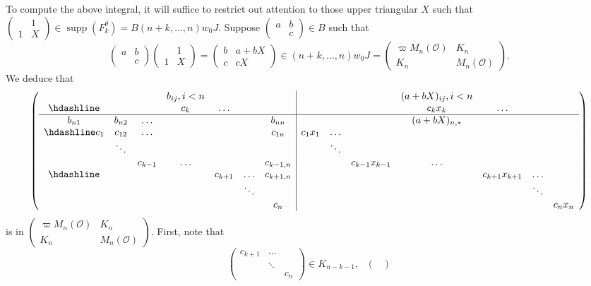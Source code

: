 \documentclass{amsart}
\theoremstyle{definition}
\newcommand{\supp}{\operatorname{supp}}
\begin{document}
{To compute the above integral, it will suffice to restrict out attention to those upper triangular $X$ such that 
$\begin{pmatrix}&1\\1&X\end{pmatrix}\in \supp(F_k^\theta)=B(n+k,\ldots,n)w_0J$. Suppose      $\begin{pmatrix}a&b\\&c\end{pmatrix}\in B$ such that
\[\begin{pmatrix}a&b\\&c\end{pmatrix}\begin{pmatrix} &1\\1&X\end{pmatrix}=\begin{pmatrix} b&a+bX\\c&cX\end{pmatrix}\in (n+k,\ldots,n)w_0J=\begin{pmatrix} \varpi M_n(\mathcal{O})&K_n\\K_n&M_n(\mathcal{O})\end{pmatrix}.\]
We deduce that
\[\left(
\begin{array}{ccccccc|ccccccc}
&&&b_{ij},i<n&&&&&&&(a+bX)_{ij},i<n&&&\\
  \hdashline
&&&c_k&\ldots&&&&&&c_kx_k&\ldots&&  \\
  \hline
  b_{n1}&b_{n2}&\ldots &&&&b_{nn} & &&&(a+bX)_{n,*}&&&\\
\hdashline
  c_{1}&c_{12}&\ldots &&&&c_{1n}&c_{1}x_{1}&\ldots&&&&&\\
        &\ddots&       &&&&      &           &\ddots&&&&&\\
        &      &c_{k-1}&\ldots &&&c_{k-1,n}& &&
                                                c_{k-1}x_{k-1}&\ldots&&&\\
  \hdashline
       &&&&c_{k+1}&\ldots &c_{k+1,n}&&&&&c_{k+1}x_{k+1}&\ldots&\\
       &&&&&\ddots &&&&&&&\ddots&\\
  &&&&&&c_n&&&&&&&c_nx_n
\end{array}
\right)\]
is in $\begin{pmatrix} \varpi
M_n(\mathcal{O})&K_n\\K_n&M_n(\mathcal{O})\end{pmatrix}$. First, note that
\[\begin{pmatrix}
c_{k+1}&\ldots&\\&\ddots&\\&&c_n\end{pmatrix}\in K_{n-k-1},\ \ \ \begin{pmatrix}

\end{pmatrix}\]}
\end{document}
